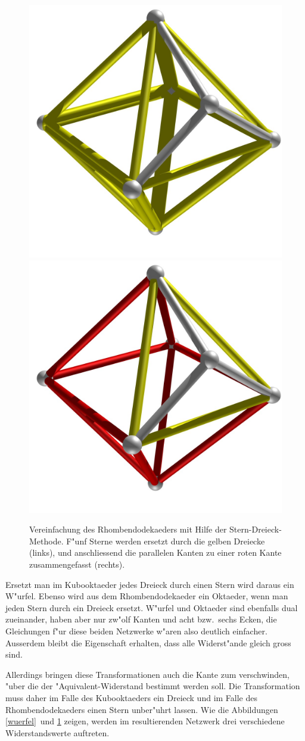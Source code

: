 \documentclass[a4paper,12pt]{article}
\begin{document}
\begin{figure}
\centering
\includegraphics[width=0.45\hsize]{oktaeder.jpg}
\quad
\includegraphics[width=0.45\hsize]{oktaeder2.jpg}
\caption{Vereinfachung des Rhombendodekaeders mit Hilfe der
Stern-Dreieck-Methode.
F"unf Sterne werden ersetzt durch die gelben Dreiecke (links), und
anschliessend die parallelen Kanten zu einer roten Kante zusammengefasst
(rechts).
\label{oktaeder}}
\end{figure}
Ersetzt man im Kubooktaeder jedes Dreieck durch einen Stern
wird daraus ein W"urfel.
Ebenso wird aus dem Rhombendodekaeder ein Oktaeder, wenn man
jeden Stern durch ein Dreieck ersetzt.
W"urfel und Oktaeder sind ebenfalls dual zueinander, haben aber 
nur zw"olf Kanten und acht bzw.~sechs Ecken, die Gleichungen
f"ur diese beiden Netzwerke w"aren also deutlich einfacher.
Ausserdem bleibt die Eigenschaft erhalten, dass alle Widerst"ande
gleich gross sind.

Allerdings bringen diese Transformationen auch die Kante zum
verschwinden, "uber die der "Aquivalent-Widerstand bestimmt werden
soll.
Die Transformation muss daher im Falle des Kubooktaeders ein Dreieck 
und im Falle des Rhombendodekaeders einen Stern unber"uhrt lassen.
Wie die Abbildungen \ref{wuerfel} und \ref{oktaeder}
zeigen, werden im resultierenden Netzwerk drei verschiedene Widerstandswerte
auftreten.
\end{document}
